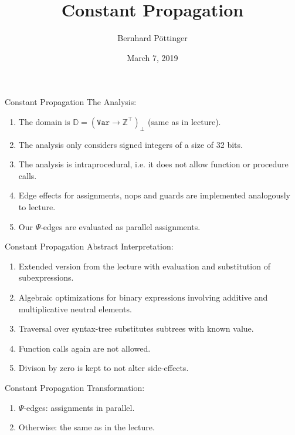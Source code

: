 \documentclass[xcolor={usenames,dvipsnames}, aspectratio=169, 12pt]{beamer}
\title[Program Optimization]{Constant Propagation}
\author[B.Pöttinger]{Bernhard Pöttinger}
\date{March 7, 2019}
\institute{Technische Universität München}
\begin{document}
\frame[plain]{\titlepage}

\begin{frame}{Constant Propagation}
	The Analysis:
	\begin{enumerate}
		\item The domain is $\mathbb D = (\texttt{Var} \to \mathbb{Z}^{\top})_{\bot}$ (same as in lecture).
		\item The analysis only considers signed integers of a size of 32 bits.
		\item The analysis is intraprocedural, i.e. it does not allow function or procedure calls.
		\item Edge effects for assignments, nops and guards are implemented analogously to lecture.
		\item Our $\Psi$-edges are evaluated as parallel assignments.
	\end{enumerate}
\end{frame}

\begin{frame}{Constant Propagation}
	Abstract Interpretation:
	\begin{enumerate}
		\item Extended version from the lecture with evaluation and substitution of subexpressions.
		\item Algebraic optimizations for binary expressions involving additive and multiplicative neutral elements.
		\item Traversal over syntax-tree substitutes subtrees with known value.
		\item Function calls again are not allowed.
		\item Divison by zero is kept to not alter side-effects.
	\end{enumerate}
\end{frame}

\begin{frame}{Constant Propagation}
	Transformation:
	\begin{enumerate}
		\item $\Psi$-edges: assignments in parallel.
		\item Otherwise: the same as in the lecture.
	\end{enumerate}
\end{frame}
\end{document}
